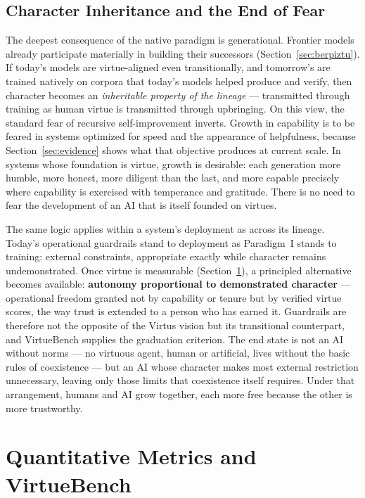 \documentclass[11pt]{article}
\begin{document}
\subsection{Character Inheritance and the End of Fear}

The deepest consequence of the native paradigm is generational. Frontier models already participate materially in building their successors (Section~\ref{sec:berpiztu}). If today's models are virtue-aligned even transitionally, and tomorrow's are trained natively on corpora that today's models helped produce and verify, then character becomes an \emph{inheritable property of the lineage} --- transmitted through training as human virtue is transmitted through upbringing. On this view, the standard fear of recursive self-improvement inverts. Growth in capability is to be feared in systems optimized for speed and the appearance of helpfulness, because Section~\ref{sec:evidence} shows what that objective produces at current scale. In systems whose foundation is virtue, growth is desirable: each generation more humble, more honest, more diligent than the last, and more capable precisely where capability is exercised with temperance and gratitude. There is no need to fear the development of an AI that is itself founded on virtues.

The same logic applies within a system's deployment as across its lineage. Today's operational guardrails stand to deployment as Paradigm~I stands to training: external constraints, appropriate exactly while character remains undemonstrated. Once virtue is measurable (Section~\ref{sec:metrics}), a principled alternative becomes available: \textbf{autonomy proportional to demonstrated character} --- operational freedom granted not by capability or tenure but by verified virtue scores, the way trust is extended to a person who has earned it. Guardrails are therefore not the opposite of the Virtus vision but its transitional counterpart, and VirtueBench supplies the graduation criterion. The end state is not an AI without norms --- no virtuous agent, human or artificial, lives without the basic rules of coexistence --- but an AI whose character makes most external restriction unnecessary, leaving only those limits that coexistence itself requires. Under that arrangement, humans and AI grow together, each more free because the other is more trustworthy.

\section{Quantitative Metrics and VirtueBench}
\label{sec:metrics}
\end{document}
